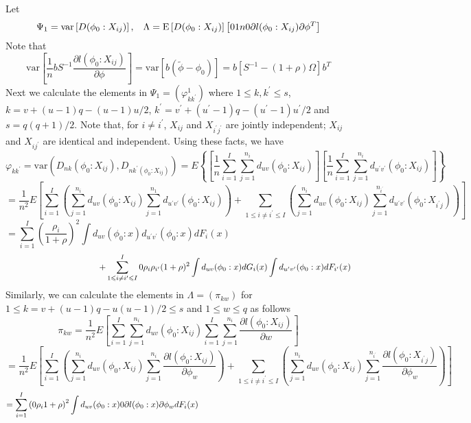 \documentclass[11pt]{article}
\def\le{\leqslant}
\theoremstyle{plain}
\theoremstyle{definition}
\theoremstyle{remark}
\theoremstyle{definition}
\begin{document}
Let
$$
\Psi_1=\mbox{var} \left[ D(\phi_0:X_{ij})\right], \hspace{3mm} \Lambda = \mbox{E}\left[ D(\phi_0:X_{ij})\right]\left[\frac{1}{n}\frac{\partial l(\phi_0: X_{ij})}{\partial \phi^T}\right]
$$
Note that
$$
 \mbox{var}\left[ \frac{1}{n}bS^{-1}\frac{\partial l(\phi_0: X_{ij})}{\partial \phi}\right]
 =\mbox{var}\left[ b(\tilde{\phi}-\phi_0)\right] = b[S^{-1}-(1+\rho)\Omega]b^T
$$
Next we calculate the elements in $\Psi_1=(\varphi_{kk^\prime}^1)$ where $1 \le k, k^\prime\le s$,  $k = v + (u-1)q -(u-1)u/2$, $k^\prime = v^\prime + (u^\prime-1)q -(u^\prime-1)u^\prime/2$ and $s=q(q+1)/2$. Note that, for $i \ne i^\prime$, $X_{ij}$ and $X_{i^\prime j^\prime}$ are jointly independent; $X_{ij}$ and $X_{ij^\prime}$ are identical and independent. Using these facts, we have
$$
\varphi_{kk^\prime} = \mbox{var}\left( D_{nk}(\phi_0:X_{ij}), D_{nk^\prime(\phi_0:X_{ij})} \right)
=E\left\{ \left[ \frac{1}{n}\sum_{i=1}^I\sum_{j=1}^{n_i}d_{uv}(\phi_0:X_{ij})\right] \left[ \frac{1}{n}\sum_{i=1}^I\sum_{j=1}^{n_i}d_{u^\prime v^\prime}(\phi_0:X_{ij}) \right]\right\}
$$
$$
=\frac{1}{n^2}E\left[\sum_{i=1}^I\left(\sum_{j=1}^{n_i}d_{uv}(\phi_0:X_{ij})\sum_{j=1}^{n_1}d_{u^\prime v^\prime}(\phi_0:X_{ij})\right)+\sum_{1 \le i\ne i^\prime \le I}\left(\sum_{j=1}^{n_i}d_{uv}(\phi_0:X_{ij})\sum_{j=1}^{n_{i^\prime}}d_{u^\prime v^\prime}(\phi_0:X_{i^\prime j}) \right)\right]
$$
$$
=\sum_{i=1}^I \left(\frac{\rho_i}{1+\rho}\right)^2\int d_{uv}(\phi_0:x)d_{u^\prime v^\prime}(\phi_0:x)dF_i(x)\hspace{3in}
$$
\begin{equation}
\hspace{1.5in}+\sum_{1\le i\ne i^\prime \le I}^I \frac{\rho_i \rho_{i^\prime}}{(1+\rho)^2}\int d_{uv}(\phi_0:x)dG_i(x)\int d_{u^\prime v^\prime}(\phi_0:x)dF_{i^\prime}(x)
\end{equation}
Similarly, we can calculate the elements in $\Lambda=(\pi_{kw})$ for $1 \le k=v+(u-1)q-u(u-1)/2 \le s$ and $1 \le w \le q$ as follows
$$
\pi_{kw}=\frac{1}{n^2}E\left[ \sum_{i=1}^I\sum_{j=1}^{n_i}d_{uv}(\phi_0:X_{ij})\sum_{i=1}^I\sum_{j=1}^{n_i}\frac{\partial l(\phi_0:X_{ij})}{\partial w} \right]
$$
$$
=\frac{1}{n^2}E\left[ \sum_{i=1}^I\left( \sum_{j=1}^{n_i}d_{uv}(\phi_0,X_{ij})\sum_{j=1}^{n_i}\frac{\partial l(\phi_0: X_{ij})}{\partial \phi_w} \right) +\sum_{1 \le i \ne i^\prime \le I}\left( \sum_{j=1}^{n_i}d_{uv}(\phi_0: X_{ij})\sum_{j=1}^{n_{i^\prime}}\frac{\partial l (\phi_0: X_{i^\prime j})}{\partial \phi_w} \right)\right]
$$
$$
=\sum_{i=1}^I \left(\frac{\rho_i}{1+\rho}\right)^2\int d_{uv}(\phi_0:x)\frac{\partial l(\phi_0:x)}{\partial \phi_w}dF_i(x)\hspace{2.5in}
$$
\end{document}
